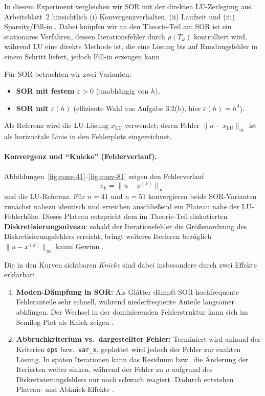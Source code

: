 \documentclass[11pt,a4paper]{article}
\begin{document}
In diesem Experiment vergleichen wir SOR mit der direkten LU-Zerlegung aus Arbeitsblatt~2 hinsichtlich
(i) Konvergenzverhalten, (ii) Laufzeit und (iii) Sparsity/Fill-in \cite{Rabus2025Serie2,Rabus2025Serie3,Projektbericht2025}.
Dabei kn\"upfen wir an den Theorie-Teil an: SOR ist ein station\"ares Verfahren, dessen Iterationsfehler durch
$\rho(T_\omega)$ kontrolliert wird, w\"ahrend LU eine direkte Methode ist, die eine L\"osung bis auf Rundungsfehler
in einem Schritt liefert, jedoch Fill-in erzeugen kann \cite{Evans2000,Higham2002}.

F\"ur SOR betrachten wir zwei Varianten:
\begin{itemize}
  \item \textbf{SOR mit festem $\varepsilon>0$} (unabh\"angig von $h$),
  \item \textbf{SOR mit $\varepsilon(h)$} (effiziente Wahl aus Aufgabe 3.2(b), hier $\varepsilon(h)=h^4$).
\end{itemize}
Als Referenz wird die LU-L\"osung $x_{\mathrm{LU}}$ verwendet; deren Fehler $\|u-x_{\mathrm{LU}}\|_\infty$
ist als horizontale Linie in den Fehlerplots eingezeichnet.

\paragraph{Konvergenz und ``Knicke'' (Fehlerverlauf).}
Abbildungen~\ref{fig:conv-41}--\ref{fig:conv-81} zeigen den Fehlerverlauf
\[
e_k=\|u-x^{(k)}\|_\infty
\]
und die LU-Referenz. F\"ur $n=41$ und $n=51$ konvergieren beide SOR-Varianten zun\"achst nahezu identisch und
erreichen anschlie\ss end ein Plateau nahe der LU-Fehlerh\"ohe. Dieses Plateau entspricht dem im Theorie-Teil
diskutierten \textbf{Diskretisierungsniveau}: sobald der Iterationsfehler die Gr\"o\ss enordnung des
Diskretisierungsfehlers erreicht, bringt weiteres Iterieren bez\"uglich $\|u-x^{(k)}\|_\infty$ kaum Gewinn
\cite{Evans2000,Sewell2018}.

Die in den Kurven sichtbaren \emph{Knicke} sind dabei insbesondere durch zwei Effekte erkl\"arbar:
\begin{enumerate}
\item \textbf{Moden-D\"ampfung in SOR:} Als Gl\"atter d\"ampft SOR hochfrequente Fehleranteile sehr schnell, w\"ahrend
      niederfrequente Anteile langsamer abklingen. Der Wechsel in der dominierenden Fehlerstruktur kann sich
      im Semilog-Plot als Knick zeigen \cite{Rabus2025Serie3,Evans2000}.
\item \textbf{Abbruchkriterium vs.\ dargestellter Fehler:} Terminiert wird anhand der Kriterien \texttt{eps} bzw.\ \texttt{var\_x},
      geplottet wird jedoch der Fehler zur exakten L\"osung. In sp\"aten Iterationen kann das Residuum bzw.\ die
      \"Anderung der Iterierten weiter sinken, w\"ahrend der Fehler zu $u$ aufgrund des Diskretisierungsfehlers nur noch
      schwach reagiert. Dadurch entstehen Plateau- und Abknick-Effekte \cite{Higham2002}.
\end{enumerate}
\end{document}
